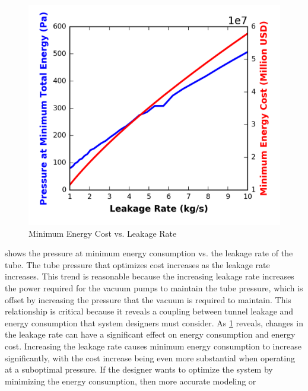 \begin{figure}
	\centering
	\includegraphics{../../images/graphs/leakage_trades/leakage_rate.png}
	\caption{Minimum Energy Cost vs. Leakage Rate}
	\label{fig:pres_vs_leakage_rate}
\end{figure}
 shows the pressure at minimum energy
consumption vs. the leakage rate of the tube. The tube pressure that optimizes
cost increases as the leakage rate increases. This trend is reasonable because the
increasing leakage rate increases the power required for the vacuum pumps to
maintain the tube pressure, which is offset by increasing the pressure that the
vacuum is required to maintain. This relationship is critical because it
reveals a coupling between tunnel leakage and energy consumption that system
designers must consider. As \cref{fig:pres_vs_leakage_rate} reveals, changes
in the leakage rate can have a significant effect on energy consumption and energy cost.
Increasing the leakage rate causes minimum energy consumption to increase
significantly, with the cost increase being even more substantial when
operating at a suboptimal pressure. If the designer wants to optimize the
system by minimizing the energy consumption, then more accurate modeling or

